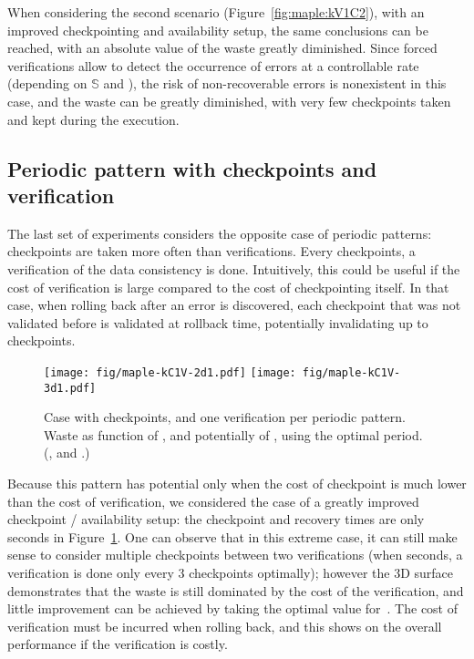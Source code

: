 \documentclass[10pt,table]{article}
\newcommand{\ema}[1]{\ensuremath{#1}\xspace}
\newcommand{\sss}{\ema{\mathbb{S}}}
\begin{document}
When considering the second scenario (Figure~\ref{fig:maple:kV1C2}),
with an improved checkpointing and availability setup, the same
conclusions can be reached, with an absolute value of the waste
greatly diminished. Since forced verifications allow to detect the
occurrence of errors at a controllable rate (depending on \sss and
), the risk of non-recoverable errors is nonexistent in this case,
and the waste can be greatly diminished, with very few checkpoints
taken and kept during the execution.

\subsection{Periodic pattern with  checkpoints and  verification}
\label{sec.evaluation.kc1v}

The last set of experiments considers the opposite case of periodic
patterns: checkpoints are taken more often than verifications. Every
 checkpoints, a verification of the data consistency is
done. Intuitively, this could be useful if the cost of verification is
large compared to the cost of checkpointing itself. In that case, when
rolling back after an error is discovered, each checkpoint that was
not validated before is validated at rollback time, potentially
invalidating up to  checkpoints.

\begin{figure}
\begin{center}
\texttt{[image: fig/maple-kC1V-2d1.pdf]}
\texttt{[image: fig/maple-kC1V-3d1.pdf]}
\caption{Case with  checkpoints, and one verification per periodic
  pattern. Waste as function of , and potentially of , using the
  optimal period.  \footnotesize{(,
    and .)}
\label{fig:maple:kC1V1}\vspace{-\baselineskip}}
\end{center}
\end{figure}

Because this pattern has potential only when the cost of checkpoint is
much lower than the cost of verification, we considered the case of a
greatly improved checkpoint / availability setup: the checkpoint and
recovery times are only  seconds in
Figure~\ref{fig:maple:kC1V1}. One can observe that in this extreme
case, it can still make sense to consider multiple checkpoints between
two verifications (when  seconds, a verification is done
only every 3 checkpoints optimally); however the 3D surface
demonstrates that the waste is still dominated by the cost of the
verification, and little improvement can be achieved by taking the
optimal value for~. The cost of verification must be incurred when rolling
back, and this shows on the overall performance if the verification is
costly.
\end{document}

